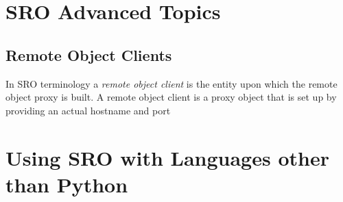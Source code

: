 \documentclass[11pt]{report}
\begin{document}
\label{app:advancedtopics}
\chapter{SRO Advanced Topics}

\section{Remote Object Clients}
In SRO terminology a \emph{remote object client} is the entity upon
which the remote object proxy is built.  A remote object client is a
proxy object that is set up by providing an actual hostname and port 

\label{app:otherlang}
\chapter{Using SRO with Languages other than Python}
\end{document}
